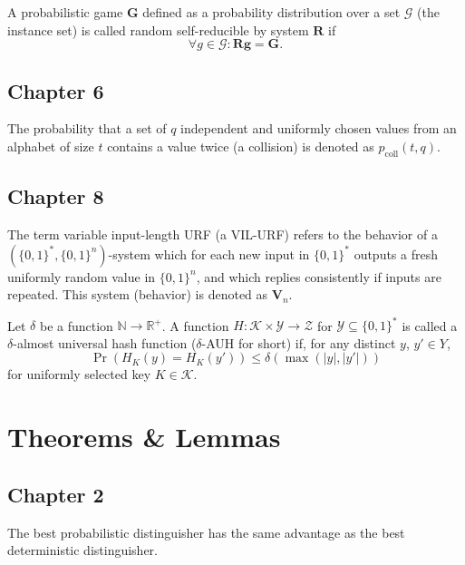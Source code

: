 \documentclass[a4paper,german]{article}
\newenvironment{customdef}[1]{\renewcommand\theinnercustomdef{#1}\innercustomdef}{\endinnercustomdef}
\newenvironment{customlem}[1]{\renewcommand\theinnercustomlem{#1}\innercustomlem}{\endinnercustomlem}
\begin{document}
\begin{customdef}{5.4}
  A probabilistic game $\mathbf{G}$ defined as a probability distribution over a set $\mathcal{G}$ (the instance set) is called random self-reducible by system $\mathbf{R}$ if
  \[
    \forall g \in \mathcal{G} :  \mathbf{R}\mathbf{g} = \mathbf{G}
  .\]
\end{customdef}







\subsection*{Chapter 6}
\begin{customdef}{6.35}
  The probability that a set of $q$ independent and uniformly chosen values from an alphabet of size $t$ contains a value twice (a collision) is denoted as $p_{\mathrm{coll}}(t,q)$.
\end{customdef}

\subsection*{Chapter 8}

\begin{customdef}{8.2}
  The term variable input-length URF (a VIL-URF) refers to the behavior of a $(\{0,1\}^*,\{0,1\}^n)$-system which for each new input in $\{0,1\}^*$ outputs a fresh uniformly random value in $\{0,1\}^n$, and which replies consistently if inputs are repeated. This system (behavior) is denoted as $\mathbf{V}_n$.
\end{customdef}

\begin{customdef}{8.3}
  Let $\delta$ be a function $\mathbb{N} \rightarrow \mathbb{R}^+$. A function $H : \mathcal{K} \times \mathcal{Y} \rightarrow \mathcal{Z}$ for $\mathcal{Y} \subseteq \{0,1\}^{*}$ is called a $\delta$-almost universal hash function ($\delta$-AUH for short) if, for any distinct $y$, $y' \in Y$,
  \[
		\Pr(H_K(y) = H_K(y')) \leq \delta(\max(|y|, |y'|))
	\]
  for uniformly selected key $K \in \mathcal{K}$.
\end{customdef}


\section*{Theorems \& Lemmas}
\subsection*{Chapter 2}
\begin{customlem}{2.0}
	The best probabilistic distinguisher has the same advantage as the best deterministic distinguisher.
\end{customlem}
\end{document}
